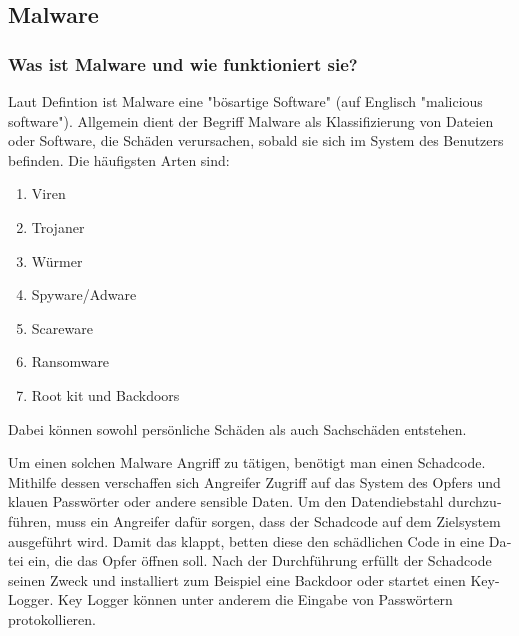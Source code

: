 \begin{otherlanguage}{ngerman}
\subsection{Malware}
\subsubsection{Was ist Malware und wie funktioniert sie?}
Laut Defintion ist Malware eine "bösartige Software"
(auf Englisch "malicious software").
\newline Allgemein dient der Begriff Malware als Klassifizierung von Dateien oder Software, die Schäden verursachen, sobald sie sich im System des Benutzers befinden. 
\newline Die häufigsten Arten sind:
\begin{enumerate}
    \item Viren
    \item Trojaner
    \item Würmer
    \item Spyware/Adware
    \item Scareware
    \item Ransomware
    \item Root kit und Backdoors
\end{enumerate}
Dabei können sowohl persönliche Schäden als auch Sachschäden entstehen.

Um einen solchen Malware Angriff zu tätigen, benötigt man einen Schadcode. 
Mithilfe dessen verschaffen sich Angreifer Zugriff auf das System des Opfers und klauen Passwörter oder andere sensible Daten.
Um den Datendiebstahl durchzuführen, muss ein Angreifer dafür sorgen, dass der Schadcode auf dem Zielsystem ausgeführt wird. 
Damit das klappt, betten diese den schädlichen Code in eine Datei ein, die das Opfer öffnen soll.
Nach der Durchführung erfüllt der Schadcode seinen Zweck und installiert zum Beispiel eine Backdoor oder startet einen Key-Logger. Key Logger können unter anderem die Eingabe von Passwörtern protokollieren.


\end{otherlanguage}
